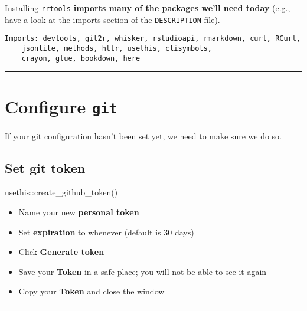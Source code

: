 \documentclass[
  letterpaper,
  DIV=11,
  numbers=noendperiod]{scrreprt}
\newenvironment{Shaded}{\begin{snugshade}}{\end{snugshade}}
\newcommand{\FunctionTok}[1]{\textcolor[rgb]{0.28,0.35,0.67}{#1}}
\newcommand{\NormalTok}[1]{\textcolor[rgb]{0.00,0.23,0.31}{#1}}
\newcommand{\SpecialCharTok}[1]{\textcolor[rgb]{0.37,0.37,0.37}{#1}}
\begin{document}
Installing \texttt{rrtools} \textbf{imports many of the packages we'll
need today} (e.g., have a look at the imports section of the
\href{https://github.com/benmarwick/rrtools/blob/master/DESCRIPTION}{\texttt{DESCRIPTION}}
file).

\begin{verbatim}
Imports: devtools, git2r, whisker, rstudioapi, rmarkdown, curl, RCurl,
    jsonlite, methods, httr, usethis, clisymbols,
    crayon, glue, bookdown, here
\end{verbatim}

\begin{center}\rule{0.5\linewidth}{0.5pt}\end{center}

\hypertarget{configure-git}{%
\section{\texorpdfstring{Configure
\texttt{git}}{Configure git}}\label{configure-git}}

If your git configuration hasn't been set yet, we need to make sure we
do so.

\hypertarget{set-git-token}{%
\subsection{\texorpdfstring{\textbf{Set git
token}}{Set git token}}\label{set-git-token}}

\begin{Shaded}
\begin{Highlighting}[]
\NormalTok{usethis}\SpecialCharTok{::}\FunctionTok{create\_github\_token}\NormalTok{()}
\end{Highlighting}
\end{Shaded}

\begin{itemize}
\item
  Name your new \textbf{personal token}
\item
  Set \textbf{expiration} to whenever (default is 30 days)
\item
  Click \textbf{Generate token}
\item
  Save your \textbf{Token} in a safe place; you will not be able to see
  it again
\item
  Copy your \textbf{Token} and close the window
\end{itemize}

\begin{center}\rule{0.5\linewidth}{0.5pt}\end{center}
\end{document}
